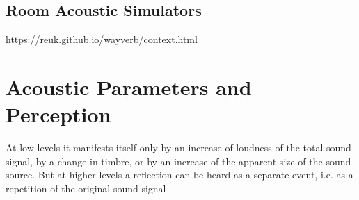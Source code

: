 

\subsection{Room Acoustic Simulators}
https://reuk.github.io/wayverb/context.html

\section{Acoustic Parameters and Perception}
At low levels it manifests itself only by an increase of loudness of the total sound signal, by a change in timbre, or by an increase of the apparent size of the sound source. But at higher levels a reflection can be heard as a separate event, i.e. as a repetition of the original sound signal
